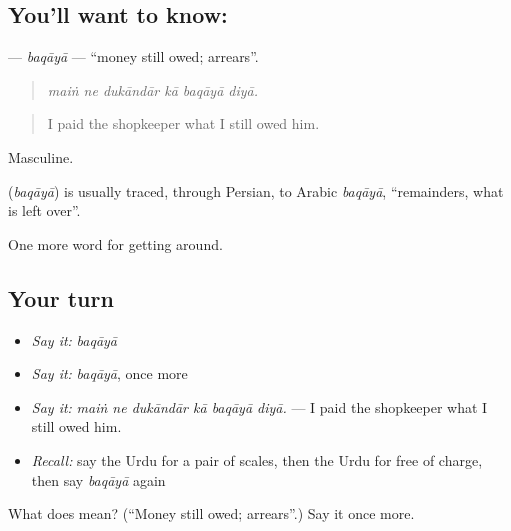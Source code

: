 \subsection*{You'll want to know: }
\textbf{} — \emph{baqāyā} — \textquotedblleft{}money still owed; arrears\textquotedblright{}.

\begin{quote}
     
\end{quote}

\begin{quote}
\emph{maiṅ ne dukāndār kā baqāyā diyā.}
\end{quote}

\begin{quote}
I paid the shopkeeper what I still owed him.
\end{quote}

Masculine.

\begin{cousinweb}
\textbf{} (\emph{baqāyā}) is usually traced, through Persian, to Arabic \emph{baqāyā}, \textquotedblleft{}remainders, what is left over\textquotedblright{}.
\end{cousinweb}

\begin{grammarlens}[title={What you've built}]
One more word for getting around.
\end{grammarlens}

\subsection*{Your turn}
\begin{itemize}
\raggedright
  \item \emph{Say it:} \emph{baqāyā}
  \item \emph{Say it:} \emph{baqāyā}, once more
  \item \emph{Say it:} \emph{maiṅ ne dukāndār kā baqāyā diyā.} — I paid the shopkeeper what I still owed him.
  \item \emph{Recall:} say the Urdu for a pair of scales, then the Urdu for free of charge, then say \emph{baqāyā} again
\end{itemize}

\begin{tcolorbox}[breakable,colback=teal!4,colframe=teal!35!black,title={Before you move on}]
What does  mean? (\textquotedblleft{}Money still owed; arrears\textquotedblright{}.) Say it once more.
\end{tcolorbox}
